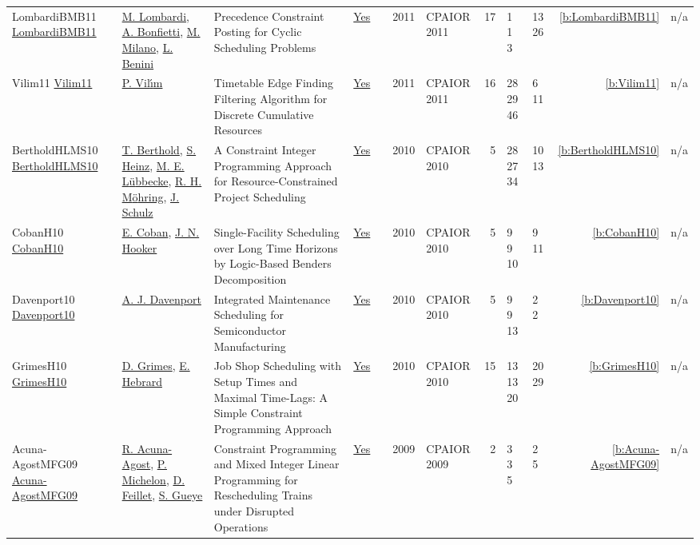 {\begin{longtable}{>{\raggedright\arraybackslash}p{3cm}>{\raggedright\arraybackslash}p{4.5cm}>{\raggedright\arraybackslash}p{6.0cm}rrrp{2.5cm}rp{1cm}p{1cm}rr}
LombardiBMB11 \href{https://doi.org/10.1007/978-3-642-21311-3_14}{LombardiBMB11} & \hyperref[auth:a142]{M. Lombardi}, \hyperref[auth:a198]{A. Bonfietti}, \hyperref[auth:a143]{M. Milano}, \hyperref[auth:a245]{L. Benini} & Precedence Constraint Posting for Cyclic Scheduling Problems & \href{../works/LombardiBMB11.pdf}{Yes} & \cite{LombardiBMB11} & 2011 & CPAIOR 2011 & 17 & 1 1 3 & 13 26 & \ref{b:LombardiBMB11} & n/a\\
Vilim11 \href{https://doi.org/10.1007/978-3-642-21311-3_22}{Vilim11} & \hyperref[auth:a121]{P. Vil{\'{\i}}m} & Timetable Edge Finding Filtering Algorithm for Discrete Cumulative Resources & \href{../works/Vilim11.pdf}{Yes} & \cite{Vilim11} & 2011 & CPAIOR 2011 & 16 & 28 29 46 & 6 11 & \ref{b:Vilim11} & n/a\\
BertholdHLMS10 \href{https://doi.org/10.1007/978-3-642-13520-0_34}{BertholdHLMS10} & \hyperref[auth:a351]{T. Berthold}, \hyperref[auth:a133]{S. Heinz}, \hyperref[auth:a352]{M. E. L{\"{u}}bbecke}, \hyperref[auth:a353]{R. H. M{\"{o}}hring}, \hyperref[auth:a134]{J. Schulz} & A Constraint Integer Programming Approach for Resource-Constrained Project Scheduling & \href{../works/BertholdHLMS10.pdf}{Yes} & \cite{BertholdHLMS10} & 2010 & CPAIOR 2010 & 5 & 28 27 34 & 10 13 & \ref{b:BertholdHLMS10} & n/a\\
CobanH10 \href{https://doi.org/10.1007/978-3-642-13520-0_11}{CobanH10} & \hyperref[auth:a335]{E. Coban}, \hyperref[auth:a160]{J. N. Hooker} & \cellcolor{green!10}Single-Facility Scheduling over Long Time Horizons by Logic-Based Benders Decomposition & \href{../works/CobanH10.pdf}{Yes} & \cite{CobanH10} & 2010 & CPAIOR 2010 & 5 & 9 9 10 & 9 11 & \ref{b:CobanH10} & n/a\\
Davenport10 \href{https://doi.org/10.1007/978-3-642-13520-0_12}{Davenport10} & \hyperref[auth:a248]{A. J. Davenport} & \cellcolor{green!10}Integrated Maintenance Scheduling for Semiconductor Manufacturing & \href{../works/Davenport10.pdf}{Yes} & \cite{Davenport10} & 2010 & CPAIOR 2010 & 5 & 9 9 13 & 2 2 & \ref{b:Davenport10} & n/a\\
GrimesH10 \href{https://doi.org/10.1007/978-3-642-13520-0_19}{GrimesH10} & \hyperref[auth:a181]{D. Grimes}, \hyperref[auth:a1]{E. Hebrard} & \cellcolor{green!10}Job Shop Scheduling with Setup Times and Maximal Time-Lags: {A} Simple Constraint Programming Approach & \href{../works/GrimesH10.pdf}{Yes} & \cite{GrimesH10} & 2010 & CPAIOR 2010 & 15 & 13 13 20 & 20 29 & \ref{b:GrimesH10} & n/a\\
Acuna-AgostMFG09 \href{https://doi.org/10.1007/978-3-642-01929-6_24}{Acuna-AgostMFG09} & \hyperref[auth:a354]{R. Acuna-Agost}, \hyperref[auth:a355]{P. Michelon}, \hyperref[auth:a356]{D. Feillet}, \hyperref[auth:a357]{S. Gueye} & Constraint Programming and Mixed Integer Linear Programming for Rescheduling Trains under Disrupted Operations & \href{../works/Acuna-AgostMFG09.pdf}{Yes} & \cite{Acuna-AgostMFG09} & 2009 & CPAIOR 2009 & 2 & 3 3 5 & 2 5 & \ref{b:Acuna-AgostMFG09} & n/a\\

\end{longtable}}
